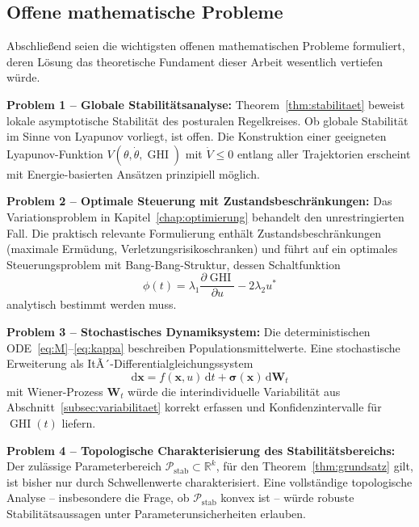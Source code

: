﻿\documentclass[12pt,a4paper]{report}
\theoremstyle{plain}
\theoremstyle{definition}
\theoremstyle{remark}
\DeclareMathOperator{\GHI}{GHI}
\begin{document}
	\subsection{Offene mathematische Probleme}
	\label{subsec:mathe}
	
	Abschließend seien die wichtigsten offenen mathematischen Probleme
	formuliert, deren Lösung das theoretische Fundament dieser Arbeit
	wesentlich vertiefen würde.
	
	\textbf{Problem 1 -- Globale Stabilitätsanalyse:}
	Theorem~\ref{thm:stabilitaet} beweist lokale asymptotische Stabilität
	des posturalen Regelkreises. Ob globale Stabilität im Sinne von Lyapunov
	vorliegt, ist offen. Die Konstruktion einer geeigneten Lyapunov-Funktion
	$V(\theta, \dot\theta, \GHI)$ mit
	$\dot{V} \leq 0$ entlang aller Trajektorien erscheint mit
	Energie-basierten Ansätzen prinzipiell möglich.
	
	\textbf{Problem 2 -- Optimale Steuerung mit Zustandsbeschränkungen:}
	Das Variationsproblem in Kapitel~\ref{chap:optimierung} behandelt
	den unrestringierten Fall. Die praktisch relevante Formulierung enthält
	Zustandsbeschränkungen (maximale Ermüdung, Verletzungsrisikoschranken)
	und führt auf ein optimales Steuerungsproblem mit
	Bang-Bang-Struktur, dessen Schaltfunktion
	\[
	\phi(t) = \lambda_1 \frac{\partial \GHI}{\partial u} - 2\lambda_2 u^*
	\]
	analytisch bestimmt werden muss.
	
	\textbf{Problem 3 -- Stochastisches Dynamiksystem:}
	Die deterministischen ODE~\eqref{eq:M}--\eqref{eq:kappa} beschreiben
	Populationsmittelwerte. Eine stochastische Erweiterung als
	ItÃ´-Differentialglei\-chungssystem
	\[
	\mathrm{d}\mathbf{x} = f(\mathbf{x}, u)\,\mathrm{d}t
	+ \boldsymbol{\sigma}(\mathbf{x})\,\mathrm{d}\mathbf{W}_t
	\]
	mit Wiener-Prozess $\mathbf{W}_t$ würde die interindividuelle
	Variabilität aus Abschnitt~\ref{subsec:variabilitaet} korrekt erfassen
	und Konfidenzintervalle für $\GHI(t)$ liefern.
	
	\textbf{Problem 4 -- Topologische Charakterisierung des Stabilitätsbereichs:}
	Der zulässige Parameterbereich $\mathcal{P}_{\mathrm{stab}} \subset \mathbb{R}^k$,
	für den Theorem~\ref{thm:grundsatz} gilt, ist bisher nur durch Schwellenwerte
	charakterisiert. Eine vollständige topologische Analyse --
	insbesondere die Frage, ob $\mathcal{P}_{\mathrm{stab}}$ konvex ist --
	würde robuste Stabilitätsaussagen unter Parameterunsicherheiten erlauben.
	
\end{document}
